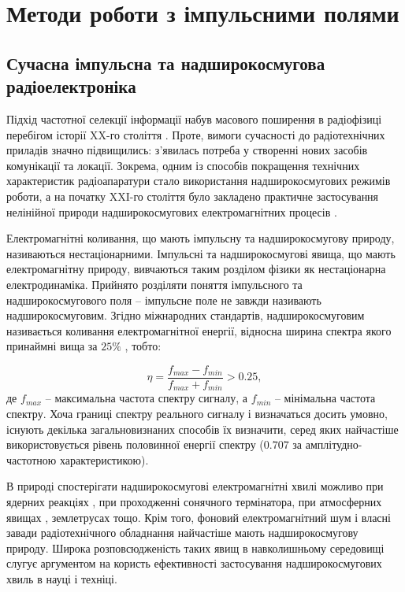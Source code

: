 \chapter{Методи роботи з імпульсними полями}
\label{ch:review}

\section{Сучасна імпульсна та надширокосмугова радіоелектроніка}

Підхід частотної селекції інформації набув масового поширення в радіофізиці
перебігом історії XX-го століття \cite{imp:Nosich2001}. Проте, вимоги 
сучасності до радіотехнічних приладів значно підвищились: з'явилась потреба 
у створенні нових засобів комунікації та локації. Зокрема, одним із 
способів покращення технічних характеристик радіоапаратури стало 
використання надширокосмугових режимів роботи, а на початку XXI-го 
століття було закладено практичне застосування нелінійної природи 
надширокосмугових електромагнітних процесів \cite{imp:Chernogor2008}.

Електромагнітні коливання, що мають імпульсну та надширокосмугову природу, 
називаються нестаціонарними. Імпульсні та надширокосмугові явища, 
що мають електромагнітну природу, вивчаються таким розділом фізики як 
нестаціонарна електродинаміка. Прийнято розділяти поняття імпульсного та
надширокосмугового поля -- імпульсне поле не завжди називають 
надширокосмуговим. Згідно міжнародних стандартів, надширокосмуговим 
називається коливання електромагнітної енергії, відносна ширина спектра 
якого принаймні вища за $ 25\% $ \cite{imp:RadarStandard2007}, тобто:

\begin{equation} \label{eq:spectum_width}
\eta = \frac{f_{max} - f_{min}}{f_{max} + f_{min}} > 0.25,
\end{equation}
%
де $ f_{max} $ -- максимальна частота спектру сигналу, а $ f_{min} $ -- 
мінімальна частота спектру. Хоча границі спектру реального сигналу і 
визначаться досить умовно, існують декілька загальновизнаних способів їх 
визначити, серед яких найчастіше використовується рівень половинної енергії 
спектру ($ 0.707 $ за амплітудно-частотною характеристикою).

В природі спостерігати надширокосмугові електромагнітні хвилі можливо при 
ядерних реакціях \cite{imp:Baum2007}, при проходженні сонячного термінатора, 
при атмосферних явищах \cite{imp:Uman2006}, землетрусах 
\cite{imp:Hayakawa2008} тощо. Крім того, фоновий електромагнітний шум і 
власні завади радіотехнічного обладнання найчастіше мають 
надширокосмугову природу. Широка розповсюдженість таких явищ в 
навколишньому середовищі слугує аргументом на користь ефективності 
застосування надширокосмугових хвиль в науці і техніці.

